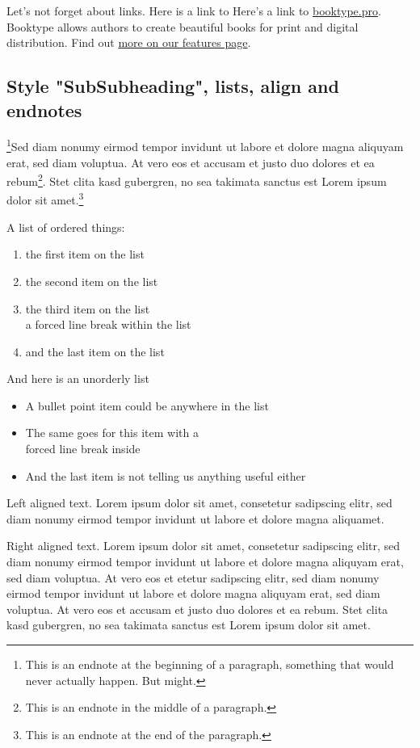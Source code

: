 Let's not forget about links. Here is a link to
Here's a link to \href{https://booktype.pro/}{booktype.pro}. 
Booktype allows authors to create beautiful books for print and digital
distribution. Find out 
\href{https://booktype.pro/en/booktype/screenshots/}{more on our
features page}.

\lipsum[3]

\subsection{Style "SubSubheading", lists, align and endnotes}
\footnote{This is an endnote at the beginning
of a paragraph, something that would never actually happen. But
might.}Sed diam
nonumy eirmod tempor invidunt ut labore et dolore magna aliquyam
erat, sed diam voluptua. At vero eos et accusam et justo duo
dolores et ea rebum\footnote{This is an endnote in the middle of
a paragraph.}. Stet clita kasd gubergren, no sea takimata
sanctus est Lorem ipsum dolor sit amet.\footnote{This is an endnote at the end of the
paragraph.}

A list of ordered things:

\begin{enumerate}  
\item the first item on the list 
\item the second item on the list 
\item the third item on the list\\a forced line break within the list
\item and the last item on the list
\end{enumerate}

And here is an unorderly list

\begin{itemize}
\item A bullet point item could be anywhere in the list
\item The same goes for this item with a\\forced line break inside
\item And the last item is not telling us anything useful either
\end{itemize}

\begin{flushleft}
Left aligned text. Lorem ipsum dolor sit amet, consetetur
sadipscing elitr, sed diam nonumy eirmod tempor invidunt ut labore
et dolore magna aliquamet.
\end{flushleft}

\begin{flushright}
Right aligned
text. Lorem ipsum dolor sit amet, consetetur sadipscing elitr,
sed diam nonumy eirmod tempor invidunt ut labore et dolore magna
aliquyam erat, sed diam voluptua. At vero eos et etetur sadipscing
elitr, sed diam nonumy eirmod tempor invidunt ut labore et dolore
magna aliquyam erat, sed diam voluptua. At vero eos et accusam et
justo duo dolores et ea rebum. Stet clita kasd gubergren, no sea
takimata sanctus est Lorem ipsum dolor sit amet.
\end{flushright}

